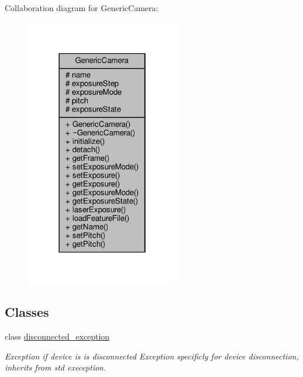 Collaboration diagram for Generic\+Camera\+:\nopagebreak
\begin{figure}[H]
\begin{center}
\leavevmode
\includegraphics[width=190pt]{class_generic_camera__coll__graph}
\end{center}
\end{figure}
\subsection*{Classes}
\begin{DoxyCompactItemize}
\item 
class \hyperlink{class_generic_camera_1_1disconnected__exception}{disconnected\+\_\+exception}
\begin{DoxyCompactList}\small\item\em Exception if device is is disconnected Exception specificly for device disconnection, inherits from std exeception. \end{DoxyCompactList}\end{DoxyCompactItemize}
